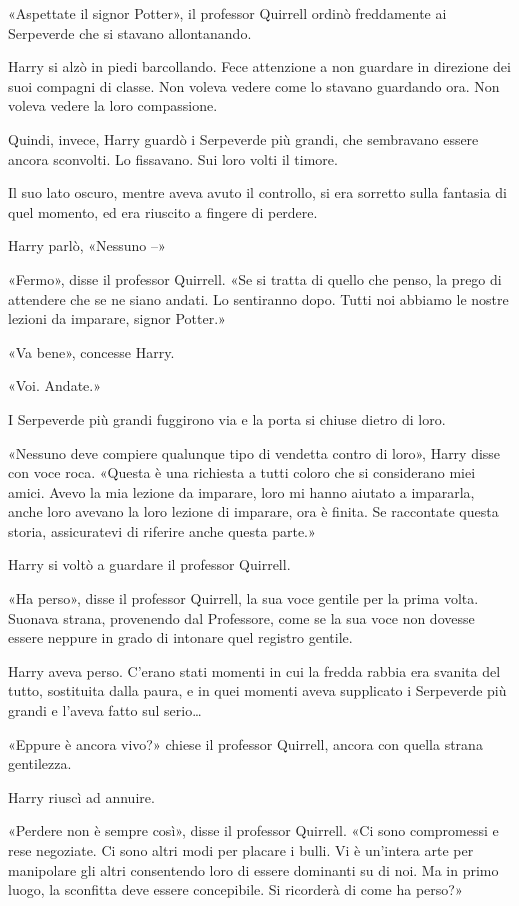 «Aspettate il signor Potter», il professor Quirrell ordinò freddamente ai Serpeverde che si stavano allontanando.

Harry si alzò in piedi barcollando. Fece attenzione a non guardare in direzione dei suoi compagni di classe. Non voleva vedere come lo stavano guardando ora. Non voleva vedere la loro compassione.

Quindi, invece, Harry guardò i Serpeverde più grandi, che sembravano essere ancora sconvolti. Lo fissavano. Sui loro volti il timore.

Il suo lato oscuro, mentre aveva avuto il controllo, si era sorretto sulla fantasia di quel momento, ed era riuscito a fingere di perdere.

Harry parlò, «Nessuno –»

«Fermo», disse il professor Quirrell. «Se si tratta di quello che penso, la prego di attendere che se ne siano andati. Lo sentiranno dopo. Tutti noi abbiamo le nostre lezioni da imparare, signor Potter.»

«Va bene», concesse Harry.

«Voi. Andate.»

I Serpeverde più grandi fuggirono via e la porta si chiuse dietro di loro.

«Nessuno deve compiere qualunque tipo di vendetta contro di loro», Harry disse con voce roca. «Questa è una richiesta a tutti coloro che si considerano miei amici. Avevo la mia lezione da imparare, loro mi hanno aiutato a impararla, anche loro avevano la loro lezione di imparare, ora è finita. Se raccontate questa storia, assicuratevi di riferire anche questa parte.»

Harry si voltò a guardare il professor Quirrell.

«Ha perso», disse il professor Quirrell, la sua voce gentile per la prima volta. Suonava strana, provenendo dal Professore, come se la sua voce non dovesse essere neppure in grado di intonare quel registro gentile.

Harry aveva perso. C’erano stati momenti in cui la fredda rabbia era svanita del tutto, sostituita dalla paura, e in quei momenti aveva supplicato i Serpeverde più grandi e l’aveva fatto sul serio…

«Eppure è ancora vivo?» chiese il professor Quirrell, ancora con quella strana gentilezza.

Harry riuscì ad annuire.

«Perdere non è sempre così», disse il professor Quirrell. «Ci sono compromessi e rese negoziate. Ci sono altri modi per placare i bulli. Vi è un’intera arte per manipolare gli altri consentendo loro di essere dominanti su di noi. Ma in primo luogo, la sconfitta deve essere concepibile. Si ricorderà di come ha perso?»

